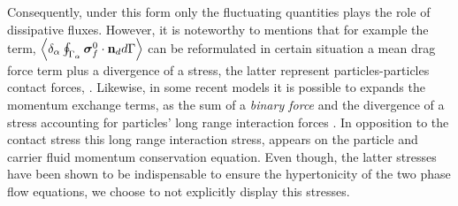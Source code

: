 Consequently, under this form only the fluctuating quantities plays the role of dissipative fluxes. 
However, it is noteworthy to mentions that for example the term, $ \left<\delta_\alpha \oint_{\Gamma_{\alpha}} {\bm{\sigma}_f^0 \cdot \textbf{n}_d} d\Gamma\right>$ can be reformulated in certain situation a mean drag force term plus a divergence of a stress, the latter represent particles-particles contact forces, \citet{jackson1997locally,zhang1997momentum,nott2011suspension,zhang2021ensemble}. 
Likewise, in some recent models it is possible to expands the momentum exchange terms, as the sum of a \textit{binary force} and the divergence of a stress accounting for particles' long range interaction forces \citep{zhang2021ensemble,nott2011suspension}. 
In opposition to the contact stress this long range interaction stress, appears on the particle and carrier fluid momentum conservation equation. 
Even though, the latter stresses have been shown to be indispensable to ensure the hypertonicity of the two phase flow equations\citep{fox2020hyperbolic}, we choose to not explicitly display this stresses. 



